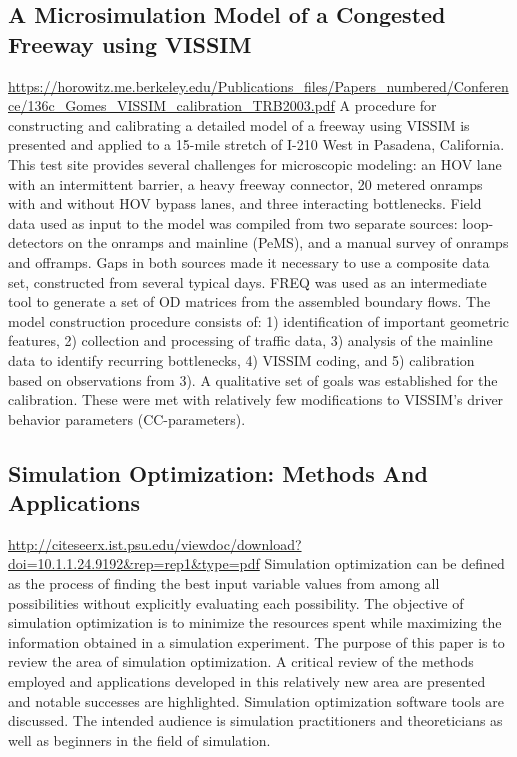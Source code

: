 \documentclass{article}
\begin{document}
\subsection*{A Microsimulation Model of a Congested Freeway using VISSIM \label{}}
\url{https://horowitz.me.berkeley.edu/Publications_files/Papers_numbered/Conference/136c_Gomes_VISSIM_calibration_TRB2003.pdf}
A procedure for constructing and calibrating a detailed model of a freeway using VISSIM is presented and applied to a 15-mile stretch of I-210 West in Pasadena, California. This test site provides several challenges for microscopic modeling: an HOV lane with an intermittent barrier, a heavy freeway connector, 20 metered onramps with and without HOV bypass lanes, and three interacting bottlenecks. Field data used as input to the model was compiled from two separate sources: loop-detectors on the onramps and mainline (PeMS), and a manual survey of onramps and offramps. Gaps in both sources made it necessary to use a composite data set, constructed from several typical days. FREQ was used as an intermediate tool to generate a set of OD matrices from the assembled boundary flows. The model construction procedure consists of: 1) identification of important geometric features, 2) collection and processing of traffic data, 3) analysis of the mainline data to identify recurring bottlenecks, 4) VISSIM coding, and 5) calibration based on observations from 3). A qualitative set of goals was established for the calibration. These were met with relatively few modifications to VISSIM's driver behavior parameters (CC-parameters).



\subsection*{Simulation Optimization: Methods And Applications}
\url{http://citeseerx.ist.psu.edu/viewdoc/download?doi=10.1.1.24.9192&rep=rep1&type=pdf}
Simulation optimization can be defined as the process of
finding the best input variable values from among all
possibilities without explicitly evaluating each
possibility. The objective of simulation optimization is to
minimize the resources spent while maximizing the
information obtained in a simulation experiment. The
purpose of this paper is to review the area of simulation
optimization. A critical review of the methods employed
and applications developed in this relatively new area are
presented and notable successes are highlighted. Simulation optimization software tools are discussed.
The intended audience is simulation practitioners and theoreticians as well as beginners in the field of simulation.
\end{document}
